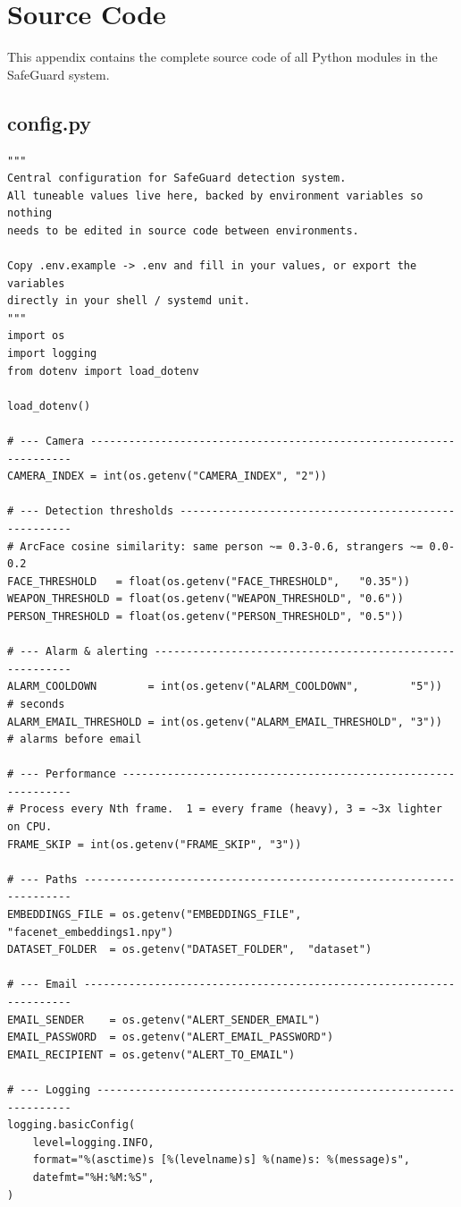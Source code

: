 \documentclass[12pt,a4paper]{report}
\begin{document}
\appendix

\chapter{Source Code}

This appendix contains the complete source code of all Python modules in the SafeGuard system.

\section{config.py}
\begin{lstlisting}
"""
Central configuration for SafeGuard detection system.
All tuneable values live here, backed by environment variables so nothing
needs to be edited in source code between environments.

Copy .env.example -> .env and fill in your values, or export the variables
directly in your shell / systemd unit.
"""
import os
import logging
from dotenv import load_dotenv

load_dotenv()

# --- Camera -------------------------------------------------------------------
CAMERA_INDEX = int(os.getenv("CAMERA_INDEX", "2"))

# --- Detection thresholds -----------------------------------------------------
# ArcFace cosine similarity: same person ~= 0.3-0.6, strangers ~= 0.0-0.2
FACE_THRESHOLD   = float(os.getenv("FACE_THRESHOLD",   "0.35"))
WEAPON_THRESHOLD = float(os.getenv("WEAPON_THRESHOLD", "0.6"))
PERSON_THRESHOLD = float(os.getenv("PERSON_THRESHOLD", "0.5"))

# --- Alarm & alerting ---------------------------------------------------------
ALARM_COOLDOWN        = int(os.getenv("ALARM_COOLDOWN",        "5"))   # seconds
ALARM_EMAIL_THRESHOLD = int(os.getenv("ALARM_EMAIL_THRESHOLD", "3"))   # alarms before email

# --- Performance --------------------------------------------------------------
# Process every Nth frame.  1 = every frame (heavy), 3 = ~3x lighter on CPU.
FRAME_SKIP = int(os.getenv("FRAME_SKIP", "3"))

# --- Paths --------------------------------------------------------------------
EMBEDDINGS_FILE = os.getenv("EMBEDDINGS_FILE", "facenet_embeddings1.npy")
DATASET_FOLDER  = os.getenv("DATASET_FOLDER",  "dataset")

# --- Email --------------------------------------------------------------------
EMAIL_SENDER    = os.getenv("ALERT_SENDER_EMAIL")
EMAIL_PASSWORD  = os.getenv("ALERT_EMAIL_PASSWORD")
EMAIL_RECIPIENT = os.getenv("ALERT_TO_EMAIL")

# --- Logging ------------------------------------------------------------------
logging.basicConfig(
    level=logging.INFO,
    format="%(asctime)s [%(levelname)s] %(name)s: %(message)s",
    datefmt="%H:%M:%S",
)
\end{lstlisting}
\end{document}
